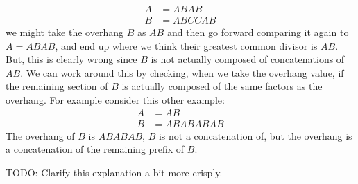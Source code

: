 \documentclass[10pt,a4paper]{article}
\begin{document}
\begin{itemize}
    \begin{align*}
        A &= ABAB \\
        B &= ABCCAB
    \end{align*}
    we might take the overhang $B$ as $AB$ and then go forward comparing it again to $A=ABAB$, and end up where we think their greatest common divisor is $AB$. But, this is clearly wrong since $B$ is not actually composed of concatenations of $AB$. We can work around this by checking, when we take the overhang value, if the remaining section of $B$ is actually composed of the same factors as the overhang. For example consider this other example:
    \begin{align*}
        A &= AB \\
        B &= ABABABAB
    \end{align*}
    The overhang of $B$ is $ABABAB$, $B$ is not a concatenation of, but the overhang is a concatenation of the remaining prefix of $B$.

    TODO: Clarify this explanation a bit more crisply.
\end{itemize}
\end{document}
